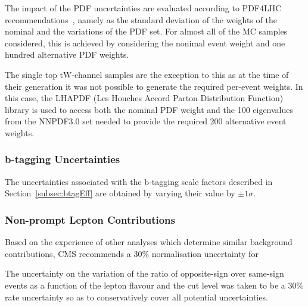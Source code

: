 The impact of the PDF uncertainties are evaluated according to PDF4LHC recommendations~\cite{Butterworth:2015oua}, namely as the standard deviation of the weights of the nominal and the variations of the PDF set.
For almost all of the MC samples considered, this is achieved by considering the nonimal event weight and one hundred alternative PDF weights.

The single top tW-channel samples are the exception to this as at the time of their generation it was not possible to generate the required per-event weights.
In this case, the LHAPDF (Les Houches Accord Parton Distribution Function) library is used to access both the nominal PDF weight and the 100 eigenvalues from the NNPDF3.0 set needed to provide the required 200 alternative event weights.

\subsubsection*{b-tagging Uncertainties}
The uncertainties associated with the b-tagging scale factors described in Section~\ref{subsec:btagEff} are obtained by varying their value by $\pm 1\sigma$.

\subsubsection*{Non-prompt Lepton Contributions}
Based on the experience of other analyses which determine similar background contributions, CMS recommends a 30\% normalisation uncertainty for 
 
The uncertainty on the variation of the ratio of opposite-sign over same-sign events as a function of the lepton flavour and the cut level was taken to be a 30\% rate uncertainty so as to conservatively cover all potential uncertainties.


